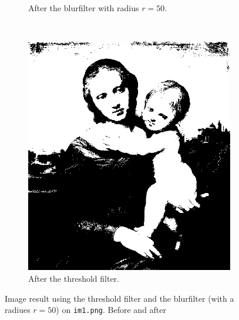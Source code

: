 \message{ !name(report.tex)}\documentclass[two column]{article}
\begin{document}
\begin{figure}[h]
\begin{subfigure}{0.3\textwidth}
    \caption{After the blurfilter with radius $r = 50$.}
  \end{subfigure}
  ~%
  \begin{subfigure}{0.3\textwidth}
    \includegraphics[width=\textwidth]{test.png}
    \caption{After the threshold filter.}
  \end{subfigure}
  \caption{Image result using the threshold filter and the blurfilter
    (with a radiues $r = 50$) on 
    \texttt{im1.png}. Before and after}
  \label{fig:thres}
\end{figure}
\end{document}
